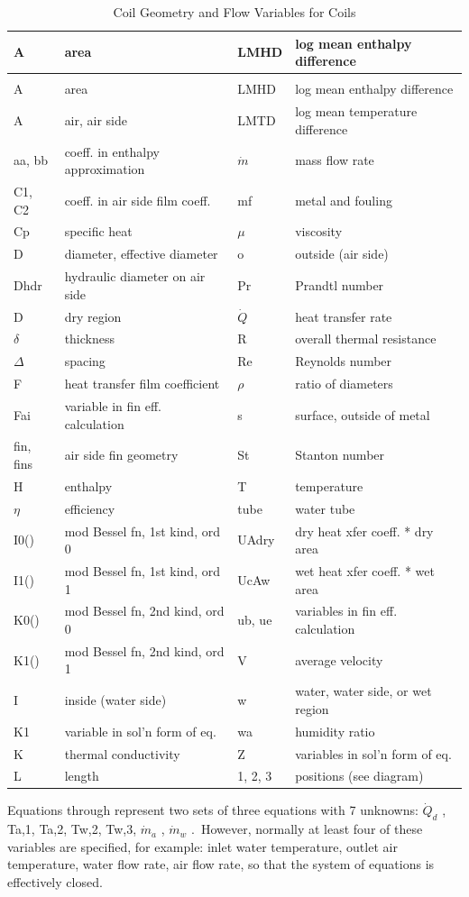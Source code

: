 \begin{longtable}[c]{p{1.5in}p{1.5in}p{1.5in}p{1.5in}}
\caption{Coil Geometry and Flow Variables for Coils \label{table:coil-geometry-and-flow-variables-for-coils}} \tabularnewline
\toprule 
A & area & LMHD & log mean enthalpy difference \tabularnewline
\midrule
\endfirsthead

\caption[]{Coil Geometry and Flow Variables for Coils} \tabularnewline
\toprule 
A & area & LMHD & log mean enthalpy difference \tabularnewline
\midrule
\endhead

A & air, air side & LMTD & log mean temperature difference \tabularnewline
aa, bb & coeff. in enthalpy approximation & $\dot m$ & mass flow rate \tabularnewline
C1, C2 & coeff. in air side film coeff. & mf & metal and fouling \tabularnewline
Cp & specific heat & $\mu$ & viscosity \tabularnewline
D & diameter, effective diameter & o & outside (air side) \tabularnewline
Dhdr & hydraulic diameter on air side & Pr & Prandtl number \tabularnewline
D & dry region & $\dot Q$ & heat transfer rate \tabularnewline
$\delta$ & thickness & R & overall thermal resistance \tabularnewline
$\Delta$ & spacing & Re & Reynolds number \tabularnewline
F & heat transfer film coefficient & $\rho$ & ratio of diameters \tabularnewline
Fai & variable in fin eff. calculation & s & surface, outside of metal \tabularnewline
fin, fins & air side fin geometry & St & Stanton number \tabularnewline
H & enthalpy & T & temperature \tabularnewline
$\eta$ & efficiency & tube & water tube \tabularnewline
I0() & mod Bessel fn, 1st kind, ord 0 & UAdry & dry heat xfer coeff. * dry area \tabularnewline
I1() & mod Bessel fn, 1st kind, ord 1 & UcAw & wet heat xfer coeff. * wet area \tabularnewline
K0() & mod Bessel fn, 2nd kind, ord 0 & ub, ue & variables in fin eff. calculation \tabularnewline
K1() & mod Bessel fn, 2nd kind, ord 1 & V & average velocity \tabularnewline
I & inside (water side) & w & water, water side, or wet region \tabularnewline
K1 & variable in sol'n form of eq. & wa & humidity ratio \tabularnewline
K & thermal conductivity & Z & variables in sol'n form of eq. \tabularnewline
L & length & 1, 2, 3 & positions (see diagram) \tabularnewline
\bottomrule
\end{longtable}

Equations through represent two sets of three equations with 7 unknowns: \({\dot Q_d}\) , Ta,1, Ta,2, Tw,2, Tw,3, \({\dot m_a}\) , \({\dot m_w}\) .~However, normally at least four of these variables are specified, for example: inlet water temperature, outlet air temperature, water flow rate, air flow rate, so that the system of equations is effectively closed.

